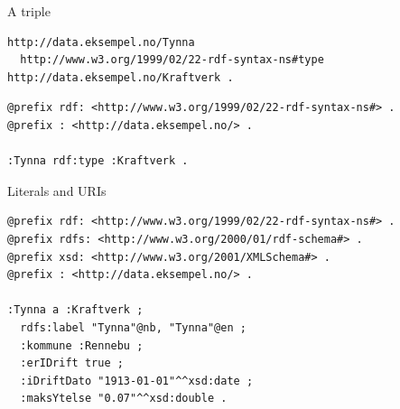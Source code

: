 \documentclass{dt}
\begin{document}
\begin{frame}[fragile]{A triple}
\begin{code}
\begin{verbatim}
http://data.eksempel.no/Tynna 
  http://www.w3.org/1999/02/22-rdf-syntax-ns#type http://data.eksempel.no/Kraftverk .
\end{verbatim}
\end{code}
\end{frame}

\begin{frame}[fragile]
\begin{code}
\begin{verbatim}
@prefix rdf: <http://www.w3.org/1999/02/22-rdf-syntax-ns#> .
@prefix : <http://data.eksempel.no/> .

:Tynna rdf:type :Kraftverk .
\end{verbatim}
\end{code}
\end{frame}

\begin{frame}[fragile]{Literals and URIs}
\begin{minipage}{0.65\textwidth}
\begin{code}[width=9.25cm]
\begin{verbatim}
@prefix rdf: <http://www.w3.org/1999/02/22-rdf-syntax-ns#> .
@prefix rdfs: <http://www.w3.org/2000/01/rdf-schema#> .
@prefix xsd: <http://www.w3.org/2001/XMLSchema#> .
@prefix : <http://data.eksempel.no/> .

:Tynna a :Kraftverk ;
  rdfs:label "Tynna"@nb, "Tynna"@en ;
  :kommune :Rennebu ;
  :erIDrift true ;
  :iDriftDato "1913-01-01"^^xsd:date ;
  :maksYtelse "0.07"^^xsd:double .
\end{verbatim}
\end{code}
\end{minipage}
\begin{minipage}{0.32\textwidth}
\end{minipage}

\end{frame}
\end{document}
